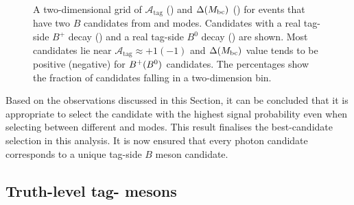 \begin{figure}[htbp!]
    \centering
    \caption{\label{fig:selecting_tag_mode} A two-dimensional grid of $\mathcal{A}_{\mathrm{tag}}$ ()
    and $\Delta({M_{\mathrm{bc}}})$ () for events that have two $B$ candidates from \feiBp and \feiBz modes.
    Candidates with a real tag-side $B^+$ decay ()
    and a real tag-side $B^0$ decay () are shown.
    Most candidates lie near $\mathcal{A}_{\mathrm{tag}}\approx +1 (-1)$ and
    $\Delta({M_{\mathrm{bc}}})$ value tends to be positive (negative) for $B^+(B^0)$ candidates.
    The percentages show the fraction of candidates falling in a two-dimension bin.
    }
\end{figure}

Based on the observations discussed in this Section, it can be concluded that it is appropriate to select the \FEI candidate with the highest signal probability even when selecting between different \feiBp and \feiBz modes.
This result finalises the best-candidate selection in this analysis.
It is now ensured that every photon candidate corresponds to a unique tag-side $B$ meson candidate.

\subsection{Truth-level tag-\texorpdfstring{\B}{B} mesons}\label{sec:good_tag_definition}

